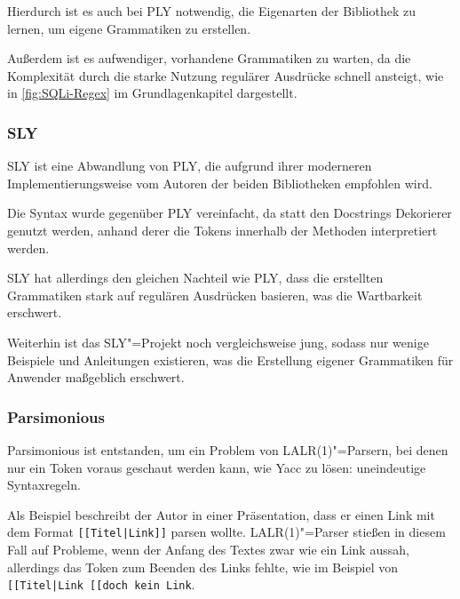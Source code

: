                 Hierdurch ist es auch bei
                \gls{PLY} notwendig,
                die Eigenarten der Bibliothek zu lernen,
                um eigene Grammatiken zu erstellen.

                Außerdem ist es aufwendiger,
                vorhandene Grammatiken zu warten,
                da die Komplexität durch die starke Nutzung regulärer Ausdrücke schnell ansteigt,
                wie in
                \vref{fig:SQLi-Regex} im Grundlagenkapitel dargestellt.

            \subsubsection{SLY}
                \gls{SLY} ist eine Abwandlung von
                \gls{PLY},
                die aufgrund ihrer moderneren Implementierungsweise vom Autoren der beiden Bibliotheken empfohlen wird.\cite{Beazley2018}

                Die Syntax wurde gegenüber
                \gls{PLY} vereinfacht,
                da statt den Docstrings Dekorierer genutzt werden,
                anhand derer die Tokens innerhalb der Methoden interpretiert werden.

                \gls{SLY} hat allerdings den gleichen Nachteil
                wie
                \gls{PLY},
                dass die erstellten Grammatiken stark auf regulären Ausdrücken basieren,
                was die Wartbarkeit erschwert.

                Weiterhin ist das
                \gls{SLY}"=Projekt noch vergleichsweise jung,
                sodass nur wenige Beispiele und
                Anleitungen existieren,
                was die Erstellung eigener Grammatiken für Anwender maßgeblich erschwert.

            \subsubsection{Parsimonious}
                Parsimonious ist entstanden,
                um ein Problem von
                \gls{LALR(1)}"=Parsern,
                bei denen nur ein Token voraus geschaut werden kann,
                wie
                \gls{Yacc} zu lösen:
                uneindeutige Syntaxregeln.

                Als Beispiel beschreibt der Autor in einer Präsentation,
                dass er einen Link mit dem Format
                \lstinline{[[Titel|Link]]} parsen wollte.
                \gls{LALR(1)}"=Parser stießen in diesem Fall auf Probleme,
                wenn der Anfang des Textes zwar
                wie ein Link aussah,
                allerdings das Token zum Beenden des Links fehlte,
                wie im Beispiel von
                \lstinline{[[Titel|Link [[doch kein Link}.\cite{Rose2012}

